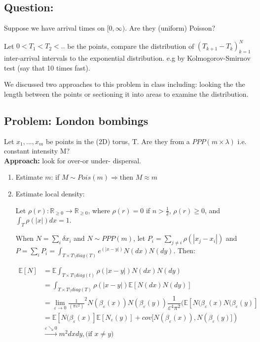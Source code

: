 \documentclass[12pt]{article}
\begin{document}
\subsection*{Question:}
Suppose we have arrival times on $[0,\infty).$ Are they (uniform) Poisson?

Let $0< T_1 <T_2<..$ be the points, compare the distribution of $(T_{k+1}-T_k)^{N}_{k=1}$ inter-arrival intervals to the exponential distribution. e.g by Kolmogorov-Smirnov test (say that 10 times fast).

We discussed two approaches to this problem in class including: looking the the length between the points or sectioning it into areas to examine the distribution.

\subsection*{Problem: London bombings} Let ${x_1,...,x_m}$ be points in the (2D) torus, T. Are they from a $PPP(m\times\lambda)$ i.e. constant intensity M?\\
\textbf{Approach:} look for over-or under- dispersal.
\begin{enumerate}
    \item Estimate $m$: if $M \sim Pois(m) \Rightarrow \text{then } M \approx m$
    
    \item Estimate local density: 
    
    Let $\rho(r):\mathbb{R}_{\geq 0}\rightarrow \mathbb{R}_{\geq 0}$, where $\rho(r)=0$ if $n>\frac{1}{2}$, $\rho(r) \geq 0$, and $\int_{T} \rho(|x|)dx=1$.
    
    When $N=\sum_i \delta {x_i}$ and  $N\sim PPP(m)$, let $P_i = \sum\limits_{j\neq i} \rho (|x_j-x_i|)$ and $P=\sum_i P_i =\int_{T\times T\setminus diag(T)} e^{(|x-y|)}N(dx)N(dy)$. Then:

    $$\begin{aligned}
    \mathbb{E}[N] &= \mathbb{E}\int_{T\times T \setminus diag(t)}  \rho (|x-y|)N(dx)N(dy) \\
    &= \int_{T\times T \setminus diag(T)} \rho  (|x-y|) \mathbb{E}[N(dx)N(dy)] \\
    &= \lim_{\varepsilon \to 0} \frac{1}{(\pi \varepsilon^2)}^2 N(\beta_\varepsilon(x))N(\beta_\varepsilon(y)) 
    \dfrac{1}{\varepsilon^4\pi^2}(\mathbb{E}[N(\beta_\varepsilon(x)N(\beta_\varepsilon(y)] \\ 
    &= \mathbb{E}[N(\beta_\varepsilon(x)]\mathbb{E}[N_\varepsilon(y)]+ cov[N(\beta_\varepsilon(x)), N(\beta_\varepsilon(y)])\\
    & \xrightarrow[]{\varepsilon \searrow 0} m^2dxdy, \text{(if } x \neq y)
    \end{aligned}$$
\end{enumerate}
\end{document}
